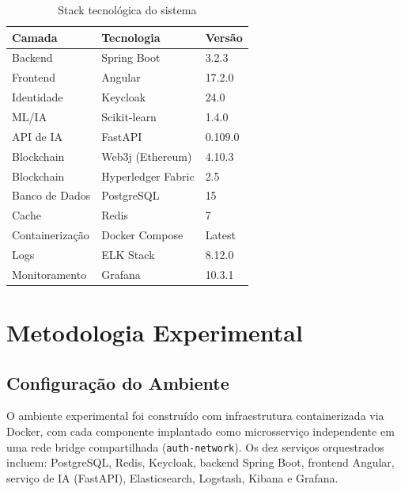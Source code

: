 \documentclass[12pt,a4paper]{article}
\begin{document}
\begin{table}[H]
\centering
\caption{Stack tecnológica do sistema}
\label{tab:tech_stack}
\begin{tabular}{@{}lll@{}}
\toprule
\textbf{Camada} & \textbf{Tecnologia} & \textbf{Versão} \\
\midrule
Backend           & Spring Boot        & 3.2.3 \\
Frontend          & Angular            & 17.2.0 \\
Identidade        & Keycloak           & 24.0 \\
ML/IA             & Scikit-learn       & 1.4.0 \\
API de IA         & FastAPI            & 0.109.0 \\
Blockchain        & Web3j (Ethereum)   & 4.10.3 \\
Blockchain        & Hyperledger Fabric & 2.5 \\
Banco de Dados    & PostgreSQL         & 15 \\
Cache             & Redis              & 7 \\
Containerização   & Docker Compose     & Latest \\
Logs              & ELK Stack          & 8.12.0 \\
Monitoramento     & Grafana            & 10.3.1 \\
\bottomrule
\end{tabular}
\end{table}

\section{Metodologia Experimental}

\subsection{Configuração do Ambiente}

O ambiente experimental foi construído com infraestrutura containerizada via Docker, com cada componente implantado como microsserviço independente em uma rede bridge compartilhada (\texttt{auth-network}). Os dez serviços orquestrados incluem: PostgreSQL, Redis, Keycloak, backend Spring Boot, frontend Angular, serviço de IA (FastAPI), Elasticsearch, Logstash, Kibana e Grafana.
\end{document}
